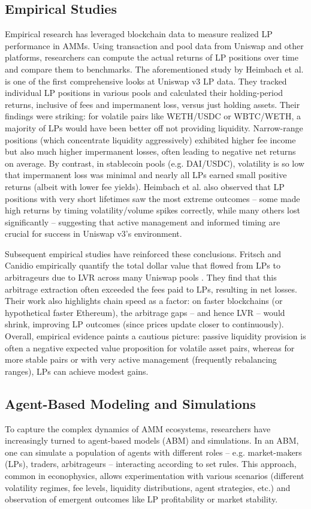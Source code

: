 \documentclass[11pt]{article}
\begin{document}
\subsection{Empirical Studies}
Empirical research has leveraged blockchain data to measure realized LP performance in AMMs. Using 
transaction and pool data from Uniswap and other platforms, researchers can compute the actual returns 
of LP positions over time and compare them to benchmarks. The aforementioned study by Heimbach et 
al. \cite{heimbach2022} is one of the first comprehensive looks at Uniswap v3 LP data. They tracked 
individual LP positions in various pools and calculated their holding-period returns, inclusive of 
fees and impermanent loss, versus just holding assets. Their findings were striking: for volatile pairs 
like WETH/USDC or WBTC/WETH, a majority of LPs would have been better off not providing liquidity. 
Narrow-range positions (which concentrate liquidity aggressively) exhibited higher fee income but 
also much higher impermanent losses, often leading to negative net returns on average. By contrast, 
in stablecoin pools (e.g. DAI/USDC), volatility is so low that impermanent loss was minimal and nearly 
all LPs earned small positive returns (albeit with lower fee yields). Heimbach et al. also observed 
that LP positions with very short lifetimes saw the most extreme outcomes – some made high returns by 
timing volatility/volume spikes correctly, while many others lost significantly – suggesting that 
active management and informed timing are crucial for success in Uniswap v3’s environment.

Subsequent empirical studies have reinforced these conclusions. Fritsch and Canidio empirically 
quantify the total dollar value that flowed from LPs to arbitrageurs due to LVR across many Uniswap 
pools \cite{fritsch2024}. They find that this arbitrage extraction often exceeded the fees paid to 
LPs, resulting in net losses. Their work also highlights chain speed as a factor: on faster blockchains 
(or hypothetical faster Ethereum), the arbitrage gaps – and hence LVR – would shrink, improving LP 
outcomes (since prices update closer to continuously). Overall, empirical evidence paints a cautious picture: 
passive liquidity provision is often a negative expected value proposition for volatile asset pairs, whereas 
for more stable pairs or with very active management (frequently rebalancing ranges), LPs can achieve modest 
gains.

\subsection{Agent-Based Modeling and Simulations}
To capture the complex dynamics of AMM ecosystems, researchers have increasingly turned to agent-based models 
(ABM) and simulations. In an ABM, one can simulate a population of agents with different roles – e.g. 
market-makers (LPs), traders, arbitrageurs – interacting according to set rules. This approach, common 
in econophysics, allows experimentation with various scenarios (different volatility regimes, fee levels, 
liquidity distributions, agent strategies, etc.) and observation of emergent outcomes like LP profitability 
or market stability.
\end{document}
